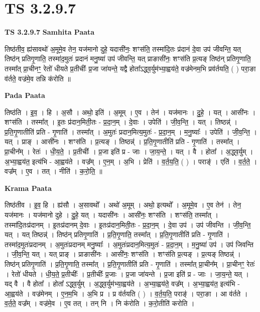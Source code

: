\documentclass[17pt]{extarticle}
\begin{document}

\section{ TS 3.2.9.7 }

\textbf{TS 3.2.9.7 } \newline
\textbf{Samhita Paata} \newline

तिष्ठ॑तीव॒ ह्य॑सावथो॑ अ॒मूमे॒व तेन॒ यज॑मानो दुहे॒ यदासी॑नः॒ शꣳस॑ति॒ तस्मा॑दि॒तः प्र॑दानं दे॒वा उप॑ जीवन्ति॒ यत् तिष्ठ॑न् प्रतिगृ॒णाति॒ तस्मा॑द॒मुतः॑ प्रदानं मनु॒ष्या॑ उप॑ जीवन्ति॒ यत् प्राङासी॑नः॒ शꣳस॑ति प्र॒त्यङ् तिष्ठ॑न् प्रतिगृ॒णाति॒ तस्मा᳚त् प्रा॒चीनꣳ॒॒ रेतो॑ धीयते प्र॒तीचीः᳚ प्र॒जा जा॑यन्ते॒ यद्वै होता᳚ऽद्ध्व॒र्युम॑भ्या॒ह्वय॑ते॒ वज्र॑मेनम॒भि प्रव॑र्तयति॒ ( ) परा॒ङा व॑र्तते॒ वज्र॑मे॒व तन्नि क॑रोति ॥ \newline

\textbf{Pada Paata} \newline

तिष्ठ॑ति । इ॒व॒ । हि । अ॒सौ । अथो॒ इति॑ । अ॒मूम् । ए॒व । तेन॑ । यज॑मानः । दु॒हे॒ । यत् । आसी॑नः । शꣳस॑ति । तस्मा᳚त् । इ॒तः प्र॑दान॒मिती॒तः - प्र॒दा॒न॒म् । दे॒वाः । उपेति॑ । जी॒व॒न्ति॒ । यत् । तिष्ठन्न्॑ । प्र॒ति॒गृ॒णातीति॑ प्रति - गृ॒णाति॑ । तस्मा᳚त् । अ॒मुतः॑ प्रदान॒मित्य॒मुतः॑ - प्र॒दा॒न॒म् । म॒नु॒ष्याः᳚ । उपेति॑ । जी॒व॒न्ति॒ । यत् । प्राङ् । आसी॑नः । शꣳस॑ति । प्र॒त्यङ् । तिष्ठन्न्॑ । प्र॒ति॒गृ॒णातीति॑ प्रति - गृ॒णाति॑ । तस्मा᳚त् । प्रा॒चीन᳚म् । रेतः॑ । धी॒य॒ते॒ । प्र॒तीचीः᳚ । प्र॒जा इति॑ प्र - जाः । जा॒य॒न्ते॒ । यत् । वै । होता᳚ । अ॒द्ध्व॒र्युम् । अ॒भ्या॒ह्वय॑त॒ इत्य॑भि - आ॒ह्वय॑ते । वज्र᳚म् । ए॒न॒म् । अ॒भि । प्रेति॑ । व॒र्त॒य॒ति॒ ( ) । पराङ्॑ । एति॑ । व॒र्त॒ते॒ । वज्र᳚म् । ए॒व । तत् । नीति॑ । क॒रो॒ति॒ ॥  \newline


\textbf{Krama Paata} \newline

तिष्ठ॑तीव । इ॒व॒ हि । ह्य॑सौ । अ॒सावथो᳚ । अथो॑ अ॒मूम् । अथो॒ इत्यथो᳚ । अ॒मूमे॒व । ए॒व तेन॑ । तेन॒ यज॑मानः । यज॑मानो दुहे । दु॒हे॒ यत् । यदासी॑नः । आसी॑नः॒ शꣳस॑ति । शꣳस॑ति॒ तस्मा᳚त् । तस्मा॑दि॒तःप्र॑दानम् । इ॒तःप्र॑दानम् दे॒वाः । इ॒तःप्र॑दान॒मिती॒तः - प्र॒दा॒न॒म् । दे॒वा उप॑ । उप॑ जीवन्ति । जी॒व॒न्ति॒ यत् । यत् तिष्ठन्न्॑ । तिष्ठ॑न् प्रतिगृ॒णाति॑ । प्र॒ति॒गृ॒णाति॒ तस्मा᳚त् । प्र॒ति॒गृ॒णातीति॑ प्रति - गृ॒णाति॑ । तस्मा॑द॒मुतः॑प्रदानम् । अ॒मुतः॑प्रदानम् मनु॒ष्याः᳚ । अ॒मुतः॑प्रदान॒मित्य॒मुतः॑ - प्र॒दा॒न॒म् । म॒नु॒ष्या॑ उप॑ । उप॑ जिवन्ति । जी॒व॒न्ति॒ यत् । यत् प्राङ् । प्राङासी॑नः । आसी॑नः॒ शꣳस॑ति । शꣳस॑ति प्र॒त्यङ् । प्र॒त्यङ् तिष्ठन्न्॑ । तिष्ठ॑न् प्रतिगृ॒णाति॑ । प्र॒ति॒गृ॒णाति॒ तस्मा᳚त् । प्र॒ति॒गृ॒णातीति॑ प्रति - गृ॒णाति॑ । तस्मा᳚त् प्रा॒चीन᳚म् । प्रा॒चीनꣳ॒॒ रेतः॑ । रेतो॑ धीयते । धी॒य॒ते॒ प्र॒तीचीः᳚ । प्र॒तीचीः᳚ प्र॒जाः । प्र॒जा जा॑यन्ते । प्र॒जा इति॑ प्र - जाः । जा॒य॒न्ते॒ यत् । यद् वै । वै होता᳚ । होता᳚ ऽद्ध्व॒र्युम् । अ॒द्ध्व॒र्युम॑भ्या॒ह्वय॑ते । अ॒भ्या॒ह्वय॑ते॒ वज्र᳚म् । अ॒भ्या॒ह्वय॑त॒ इत्य॑भि - आ॒ह्वय॑ते । वज्र॑मेनम् । ए॒न॒म॒भि । अ॒भि प्र । प्र व॑र्तयति ( ) । व॒र्त॒य॒ति॒ पराङ्॑ । परा॒ङा । आ व॑र्तते । व॒र्त॒ते॒ वज्र᳚म् । वज्र॑मे॒व । ए॒व तत् । तन् नि । नि क॑रोति । क॒रो॒तीति॑ करोति । \newline
\end{document}

